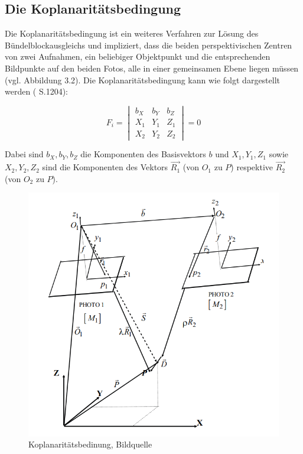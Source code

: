 \subsection{Die Koplanaritätsbedingung}

Die Koplanaritätsbedingung ist ein weiteres Verfahren zur Lösung des Bündelblockausgleichs und impliziert, dass die beiden perspektivischen Zentren von zwei Aufnahmen, ein beliebiger Objektpunkt und die entsprechenden Bildpunkte auf den beiden Fotos, alle in einer gemeinsamen Ebene liegen müssen (vgl. Abbildung 3.2). Die Koplanaritätsbedingung kann wie folgt dargestellt werden (\cite{pose_est_epi} S.1204):

\begin{equation}
F_i = \begin{vmatrix}
b_X & b_Y & b_Z \\
X_1 & Y_1 & Z_1 \\
X_2 & Y_2 & Z_2
\end{vmatrix}
=0
\end{equation}

Dabei sind $b_X,b_Y,b_Z$ die Komponenten des Basisvektors $b$ und $X_1,Y_1,Z_1$ sowie $X_2,Y_2,Z_2$ sind die Komponenten des Vektors $\vec{R_1}$ (von $O_1$ zu $P$) respektive  $\vec{R_2}$ (von $O_2$ zu $P$).


\begin{figure}[H]
	\centering
	\includegraphics[scale=0.6]{coplanarity.png}
	\caption{Koplanaritätsbedinung, Bildquelle \cite{comparative_conditions_study}}
\end{figure} 

